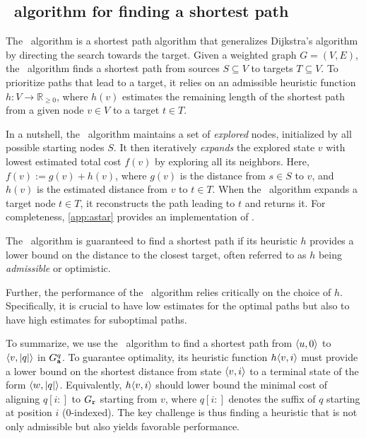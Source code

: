 \subsection{\A~algorithm for finding a shortest path} \label{sec:astar}
%
The \A~algorithm is a shortest path algorithm that generalizes Dijkstra's
algorithm by directing the search towards the target.
Given a weighted graph $G=(V,E)$, the \A~algorithm finds a shortest path from
sources $S \subseteq V$ to targets $T \subseteq V$.
%
To prioritize paths that lead to a target, it relies on an admissible heuristic
function $h \colon V \to \mathbb{R}_{\geq 0}$, where $h(v)$ estimates the
remaining length of the shortest path from a given node $v \in V$ to a target
$t \in T$.


% 
In a nutshell, the \A~algorithm maintains a set of \emph{explored} nodes,
initialized by all possible starting nodes $S$. It then iteratively
\emph{expands} the explored state $v$ with lowest estimated total cost $f(v)$ by
exploring all its neighbors. Here, $f(v) := g(v) + h(v)$, where $g(v)$ is the
distance from $s \in S$ to $v$, and $h(v)$ is the estimated distance from $v$ to
$t \in T$.
%
When the \A~algorithm expands a target node $t \in T$, it reconstructs the path
leading to $t$ and returns it.
%
For completeness, \cref{app:astar} provides an implementation of \A.

%
The \A~algorithm is guaranteed to find a shortest path if its heuristic $h$
provides a lower bound on the distance to the closest target, often referred to
as $h$ being \emph{admissible} or optimistic.

Further, the performance of the \A~algorithm relies critically on the choice of
$h$. Specifically, it is crucial to have low estimates for the optimal paths but
also to have high estimates for suboptimal paths.

%
To summarize, we use the \A~algorithm to find a shortest path from $\langle u, 0 \rangle$
to $\langle v, |q| \rangle$ in $G_\texttt{a}^{q}$. To guarantee optimality, its heuristic function
$h\langle v, i \rangle$ must provide a lower bound on the shortest distance from state
$\langle v, i \rangle$ to a terminal state of the form $\langle w, \lvert q \rvert \rangle$.
%
Equivalently, $h\langle v, i \rangle$ should lower bound the minimal cost of aligning
$q[i{:}]$ to $G_\texttt{r}$ starting from $v$, where $q[i{:}]$ denotes the suffix of $q$
starting at position $i$ ($0$-indexed).
%
The key challenge is thus finding a heuristic that is not only admissible but
also yields favorable performance.
